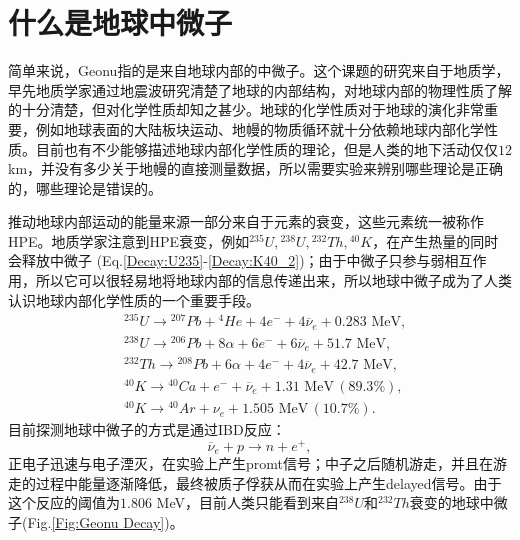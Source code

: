 		\section{什么是地球中微子}
			简单来说，Geonu指的是来自地球内部的中微子。这个课题的研究来自于地质学，早先地质学家通过地震波研究清楚了地球的内部结构，对地球内部的物理性质了解的十分清楚，但对化学性质却知之甚少。地球的化学性质对于地球的演化非常重要，例如地球表面的大陆板块运动、地幔的物质循环就十分依赖地球内部化学性质。目前也有不少能够描述地球内部化学性质的理论，但是人类的地下活动仅仅$12$ km，并没有多少关于地幔的直接测量数据，所以需要实验来辨别哪些理论是正确的，哪些理论是错误的。\par
			推动地球内部运动的能量来源一部分来自于元素的衰变，这些元素统一被称作HPE。地质学家注意到HPE衰变，例如${}^{235}U, {}^{238}U, {}^{232}Th, {}^{40}K$，在产生热量的同时会释放中微子\cite{fiorentini2007geo} (Eq.\ref{Decay:U235}-\ref{Decay:K40_2})；由于中微子只参与弱相互作用，所以它可以很轻易地将地球内部的信息传递出来，所以地球中微子成为了人类认识地球内部化学性质的一个重要手段。
				\begin{align}
					&{}^{235}U \longrightarrow {}^{207}Pb + {}^{4}He + 4e^- + 4\overline{\nu}_e + 0.283 \text{ MeV},
					\label{Decay:U235}\\
					&{}^{238}U \longrightarrow {}^{206}Pb + 8\alpha + 6e^- + 6\overline{\nu}_e + 51.7 \text{ MeV},
					\label{Decay:U238}\\
					&{}^{232}Th \longrightarrow {}^{208}Pb + 6\alpha + 4e^- + 4\overline{\nu}_e + 42.7 \text{ MeV},
					\label{Decay:Th232}\\
					&{}^{40}K \longrightarrow {}^{40}Ca + e^- + \overline{\nu}_e + 1.31 \text{ MeV} \,(89.3\%),
					\label{Decay:K40_1}\\
					&{}^{40}K \longrightarrow {}^{40}Ar + \nu_e + 1.505 \text{ MeV} \,(10.7\%).
					\label{Decay:K40_2}
				\end{align}
			目前探测地球中微子的方式是通过IBD反应：
				\begin{equation}
					\overline{\nu}_e + p \longrightarrow n + e^+,
				\end{equation}
			正电子迅速与电子湮灭，在实验上产生promt信号；中子之后随机游走，并且在游走的过程中能量逐渐降低，最终被质子俘获从而在实验上产生delayed信号。由于这个反应的阈值为$1.806$ MeV，目前人类只能看到来自${}^{238}U$和${}^{232}Th$衰变的地球中微子(Fig.\ref{Fig:Geonu Decay})。
